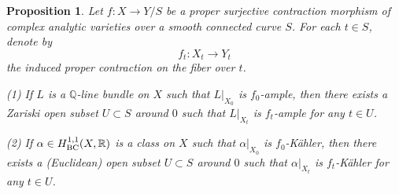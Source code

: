 \documentclass[12pt]{amsart}
\numberwithin{equation}{section}
\newtheorem{proposition}[theorem]{Proposition}
\theoremstyle{definition}
\theoremstyle{plain}
\newtheorem*{thm A*}{Theorem A}
\newtheorem*{thm B*}{Theorem B}
\newtheorem*{thm C*}{Theorem C}
\newtheorem*{thm D*}{Theorem D}
\theoremstyle{definition}
\renewcommand{\1}{\mathds{1}}
\renewcommand{\>}{\rightarrow}
\newcommand{\R}{\mathbb R}
\begin{document}
\begin{proposition}\label{DefAmple}
Let $f: X \to Y/S$ be a proper surjective contraction morphism of complex analytic varieties over a smooth connected curve $S$. For each $t \in S$, denote by
\[
f_t : X_t \to Y_t
\]
the induced proper contraction on the fiber over $t$. 

(1) If $L$ is a $\mathbb{Q}$-line bundle on $X$ such that $L|_{X_0}$ is $f_0$-ample, then there exists a Zariski open subset $U \subset S$ around $0$ such that $L|_{X_t}$ is $f_t$-ample for any $t \in U$.

(2) If $\alpha\in H^{1,1}_{\rm{BC}}(X, \R)$ is a class on $X$ such that $\alpha|_{X_0}$ is $f_0$-K\"ahler, then there exists a (Euclidean) open subset $U\subset S$ around $0$ such that $\alpha|_{X_t}$ is $f_t$-K\"ahler for any $t\in U$. 
\end{proposition}
\end{document}
